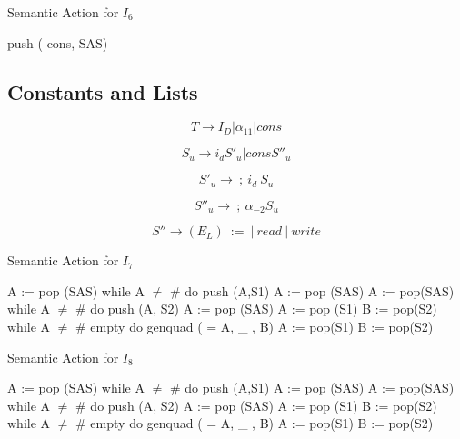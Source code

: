 \documentclass[11pt]{article}
\begin{document}
\begin{algorithm}
\caption{ Semantic Action for $I_6$}
\label{alg: I6}
\begin{algorithmic}
\STATE push ( cons, SAS)

\end{algorithmic}
\end{algorithm}


\subsection {Constants and Lists}
\[ T\to I_D | \alpha_{11} | cons \]

\[ S_u \to	i_d S'_u | cons S''_u \]

\[ S'_u \to \ ; \  i_d \ S_u  \]

\[ S''_u \to \ ; \  \alpha_{-2} S_u \]

\[ S'' \to ( E_L ) \ := \  | \ read \ | \ write \]

\begin{algorithm}
\caption{ Semantic Action for $I_7$}
\label{alg: I7}
\begin{algorithmic}
\STATE A := pop (SAS)
\STATE while A $\neq$ \# do 
\STATE \hspace{0.5 cm} push (A,S1)
\STATE \hspace{0.5 cm} A := pop (SAS)
\STATE A := pop(SAS)
\STATE while A $\neq$ \# do
\STATE \hspace{0.5 cm} push (A, S2)
\STATE \hspace{0.5 cm} A := pop (SAS)
\STATE A := pop (S1)
\STATE B := pop(S2)
\STATE while A $\neq$ \# empty do
\STATE \hspace{0.5 cm} genquad ( = A, \_ , B)
\STATE \hspace{0.5 cm} A := pop(S1)
\STATE \hspace{0.5 cm} B := pop(S2)
\end{algorithmic}
\end{algorithm}


\begin{algorithm}
\caption{ Semantic Action for $I_8$}
\label{alg: I10}
\begin{algorithmic}
\STATE A := pop (SAS)
\STATE while A $\neq$ \# do 
\STATE \hspace{0.5 cm} push (A,S1)
\STATE \hspace{0.5 cm} A := pop (SAS)
\STATE A := pop(SAS)
\STATE while A $\neq$ \# do
\STATE \hspace{0.5 cm} push (A, S2)
\STATE \hspace{0.5 cm} A := pop (SAS)
\STATE A := pop (S1)
\STATE B := pop(S2)
\STATE while A $\neq$ \# empty do
\STATE \hspace{0.5 cm} genquad ( = A, \_ , B)
\STATE \hspace{0.5 cm} A := pop(S1)
\STATE \hspace{0.5 cm} B := pop(S2)
\end{algorithmic}
\end{algorithm}


 
\end{document}
